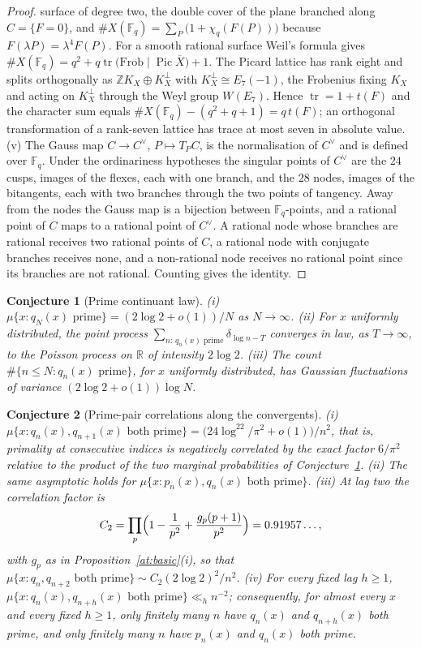 \documentclass[11pt]{article}
\newtheorem{conjecture}{Conjecture}
\theoremstyle{definition}
\newcommand{\Fq}{\mathbb F}
\newcommand{\Z}{\mathbb Z}
\newcommand{\R}{\mathbb R}
\providecommand{\Z}{\mathbb Z}
\providecommand{\R}{\mathbb R}
\begin{document}
\begin{proof}
surface of degree two, the double cover of the plane branched along
$C=\{F=0\}$, and $\#X(\Fq_q)=\sum_P\bigl(1+\chi_q(F(P))\bigr)$ because
$F(\lambda P)=\lambda^4F(P)$.  For a smooth rational surface Weil's formula
gives $\#X(\Fq_q)=q^2+q\operatorname{tr}\bigl(\mathrm{Frob}\mid
\operatorname{Pic}\overline X\bigr)+1$.  The Picard lattice
has rank eight and splits orthogonally as $\Z K_X\oplus K_X^\perp$ with
$K_X^\perp\cong E_7(-1)$, the Frobenius fixing $K_X$ and acting on
$K_X^\perp$ through the Weyl group $W(E_7)$.  Hence
$\operatorname{tr}=1+t(F)$ and the character sum equals
$\#X(\Fq_q)-(q^2+q+1)=q\,t(F)$; an orthogonal transformation of a rank-seven
lattice has trace at most seven in absolute value.
{\rm(v)} The Gauss map $C\to C^\vee$, $P\mapsto T_PC$, is the normalisation
of $C^\vee$ and is defined over $\Fq_q$.  Under the ordinariness hypotheses
the singular points of $C^\vee$ are the $24$ cusps, images of the flexes,
each with one branch, and the $28$ nodes, images of the bitangents, each
with two branches through the two points of tangency.  Away from the nodes
the Gauss map is a bijection between $\Fq_q$-points, and a rational point of
$C$ maps to a rational point of $C^\vee$.  A rational node whose branches
are rational receives two rational points of $C$, a rational node with
conjugate branches receives none, and a non-rational node receives no
rational point since its branches are not rational.  Counting gives the
identity.
\end{proof}

\begin{conjecture}[Prime continuant law]\label{at1}
{\rm(i)} $\mu\{x:q_N(x)\text{ prime}\}=(2\log2+o(1))/N$ as $N\to\infty$.
{\rm(ii)} For $x$ uniformly distributed, the point process
$\sum_{n:\,q_n(x)\text{ prime}}\delta_{\log n-T}$ converges in law, as
$T\to\infty$, to the Poisson process on $\R$ of intensity $2\log2$.
{\rm(iii)} The count $\#\{n\le N:q_n(x)\text{ prime}\}$, for $x$ uniformly
distributed, has Gaussian fluctuations of variance $(2\log2+o(1))\log N$.
\end{conjecture}


\begin{conjecture}[Prime-pair correlations along the convergents]\label{at2}
{\rm(i)} $\mu\{x:q_n(x),q_{n+1}(x)\text{ both prime}\}
 =\bigl(24\log^22/\pi^2+o(1)\bigr)/n^2$, that is, primality at consecutive
indices is negatively correlated by the exact factor $6/\pi^2$ relative to
the product of the two marginal probabilities of Conjecture~\ref{at1}.
{\rm(ii)} The same asymptotic holds for
$\mu\{x:p_n(x),q_n(x)\text{ both prime}\}$.
{\rm(iii)} At lag two the correlation factor is
\[
 C_2=\prod_p\Bigl(1-\frac1{p^2}+\frac{g_p(p+1)}{p^2}\Bigr)=0.91957\ldots,
\]
with $g_p$ as in Proposition~\ref{at:basic}(i), so that
$\mu\{x:q_n,q_{n+2}\text{ both prime}\}\sim C_2(2\log2)^2/n^2$.
{\rm(iv)} For every fixed lag $h\ge1$,
$\mu\{x:q_n(x),q_{n+h}(x)\text{ both prime}\}\ll_hn^{-2}$; consequently,
for almost every $x$ and every fixed $h\ge1$, only finitely many $n$ have
$q_n(x)$ and $q_{n+h}(x)$ both prime, and only finitely many $n$ have
$p_n(x)$ and $q_n(x)$ both prime.
\end{conjecture}
\end{document}
